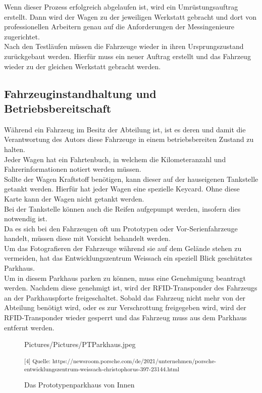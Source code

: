 Wenn dieser Prozess erfolgreich abgelaufen ist, wird ein Umrüstungsauftrag erstellt. Dann wird der Wagen zu der jeweiligen Werkstatt gebracht und dort von professionellen Arbeitern genau auf die Anforderungen der Messingenieure zugerichtet. \\

Nach den Testläufen müssen die Fahrzeuge wieder in ihren Ursprungszustand zurückgebaut werden. Hierfür muss ein neuer Auftrag erstellt und das Fahrzeug wieder zu der gleichen Werkstatt gebracht werden. \\

\subsection{Fahrzeuginstandhaltung und Betriebsbereitschaft}

Während ein Fahrzeug im Besitz der Abteilung ist, ist es deren und damit die Verantwortung des Autors diese Fahrzeuge in einem betriebsbereiten Zustand zu halten.\\
Jeder Wagen hat ein Fahrtenbuch, in welchem die Kilometeranzahl und Fahrerinformationen notiert werden müssen. \\
Sollte der Wagen Kraftstoff benötigen, kann dieser auf der hauseigenen Tankstelle getankt werden. Hierfür hat jeder Wagen eine spezielle Keycard. Ohne diese Karte kann der Wagen nicht getankt werden. \\

Bei der Tankstelle können auch die Reifen aufgepumpt werden, insofern dies notwendig ist. \\

Da es sich bei den Fahrzeugen oft um Prototypen oder Vor-Serienfahrzeuge handelt, müssen diese mit Vorsicht behandelt werden. \\
Um das Fotografieren der Fahrzeuge während sie auf dem Gelände stehen zu vermeiden, hat das Entwicklungszentrum Weissach ein speziell Blick geschütztes Parkhaus.\\
Um in diesem Parkhaus parken zu können, muss eine Genehmigung beantragt werden. Nachdem diese genehmigt ist, wird der RFID-Transponder des Fahrzeugs an der Parkhauspforte freigeschaltet. Sobald das Fahrzeug nicht mehr von der Abteilung benötigt wird, oder es zur Verschrottung freigegeben wird, wird der RFID-Transponder wieder gesperrt und das Fahrzeug muss aus dem Parkhaus entfernt werden. \\

\begin{figure}[H]
	\begin{center}
		\begin{overpic}[width=\linewidth]{Pictures/Pictures/PTParkhaus.jpeg}
			
		\end{overpic}
		\label{PT}
		\caption{Das Prototypenparkhaus von Innen}
		\small\textsuperscript{[4] Quelle: https://newsroom.porsche.com/de/2021/unternehmen/porsche-entwicklungszentrum-weissach-christophorus-397-23144.html}
	\end{center}
\end{figure}  

